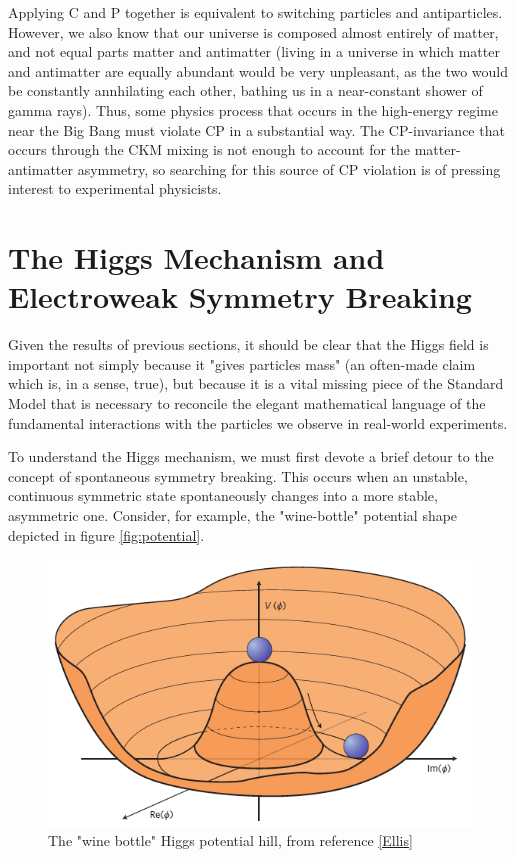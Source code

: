 Applying C and P together is equivalent to switching particles and antiparticles. However, we also know that our universe is composed almost entirely of matter, and not equal parts matter and antimatter (living in a universe in which matter and antimatter are equally abundant would be very unpleasant, as the two would be constantly annhilating each other, bathing us in a near-constant shower of gamma rays). Thus, some physics process that occurs in the high-energy regime near the Big Bang must violate CP in a substantial way. The CP-invariance that occurs through the CKM mixing is not enough to account for the matter-antimatter asymmetry, so searching for this source of CP violation is of pressing interest to experimental physicists.

\section{The Higgs Mechanism and Electroweak Symmetry Breaking} \label{sec:EWSB} 

Given the results of previous sections, it should be clear that the Higgs field is important not simply because it "gives particles mass" (an often-made claim which is, in a sense, true), but because it is a vital missing piece of the Standard Model that is necessary to reconcile the elegant mathematical language of the fundamental interactions with the particles we observe in real-world experiments.

To understand the Higgs mechanism, we must first devote a brief detour to the concept of spontaneous symmetry breaking. This occurs when an unstable, continuous symmetric state spontaneously changes into a more stable, asymmetric one. Consider, for example, the "wine-bottle" potential shape depicted in figure \ref{fig:potential}.

\begin{figure}
\includegraphics[width=\linewidth]{figures/theory_chapter/higgspotential.png}
\caption{The "wine bottle" Higgs potential hill, from reference \ref{Ellis}}
\end{figure}

